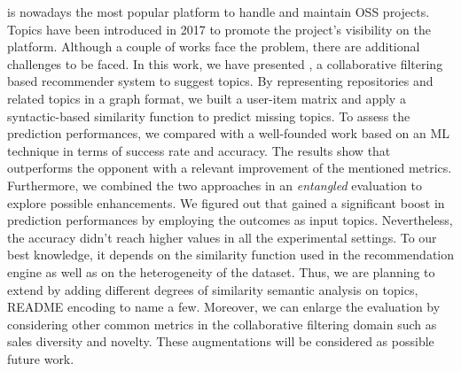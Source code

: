 \GH is nowadays the most popular platform to handle and maintain OSS projects. Topics have been introduced in 2017 to promote the project's visibility on the platform. Although a couple of works face the problem, there are additional challenges to be faced. 
In this work, we have presented \CT, a collaborative filtering based recommender system to suggest \GH topics.  By representing repositories and related topics in a graph format, we built a user-item matrix and apply a syntactic-based similarity function to predict missing topics. To assess the prediction performances, we compared \CT with a well-founded work based on an ML technique in terms of success rate and accuracy. The results show that \CT outperforms the opponent with a relevant improvement of the mentioned metrics. Furthermore, we combined the two approaches in an \emph{entangled} evaluation to explore possible enhancements. We figured out that \CT gained a significant boost in prediction performances by employing the \MNB outcomes as input topics. Nevertheless, the accuracy didn't reach higher values in all the experimental settings. To our best knowledge, it depends on the similarity function used in the recommendation engine as well as on the heterogeneity of the dataset. Thus, we are planning to extend \CT by adding different degrees of similarity \ie semantic analysis on topics, README encoding to name a few. Moreover, we can enlarge the evaluation by considering other common metrics in the collaborative filtering domain such as sales diversity and novelty. These augmentations will be considered as possible future work.
